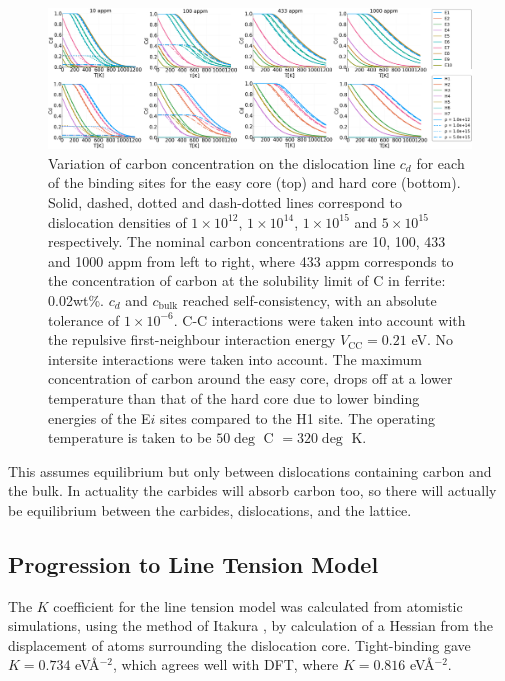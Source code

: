 \documentclass[a4paper,11pt]{article}
\begin{document}
\begin{landscape}
   \begin{figure}	
      \includegraphics[width=1.8\textwidth]{Images/mcclean_isotherm_all.png} 		
   \caption{ Variation of carbon concentration on the dislocation line $c_d$ for each of the binding sites for the easy core (top) and hard core (bottom). Solid, dashed, dotted and dash-dotted lines correspond to dislocation densities of $1\times10^{12}$, $1\times10^{14}$, $1\times10^{15}$ and $5\times10^{15}$ respectively. The nominal carbon concentrations are 10, 100, 433 and 1000 appm from left to right, where 433 appm corresponds to the concentration of carbon at the solubility limit of C in ferrite: 0.02wt\%. $c_d$ and $c_{\text{bulk}}$ reached self-consistency, with an absolute tolerance of $1\times10^{-6}$. C-C interactions were taken into account with the repulsive first-neighbour interaction energy $V_{\text{CC}}=0.21$ eV. No intersite interactions were taken into account. The maximum concentration of carbon around the easy core, drops off at a lower temperature than that of the hard core due to lower binding energies of the E$i$ sites compared to the H1 site. The operating temperature is taken to be $50\deg$ C $= 320 \deg$ K. }
   \label{cdhardeasy}
      \end{figure}
      \end{landscape}

This assumes equilibrium but only between dislocations containing carbon and the
bulk. In actuality the carbides will absorb carbon too, so there will actually be
equilibrium between the carbides, dislocations, and the lattice.






\subsection{Progression to Line Tension Model}
\label{sec:org7dda4c1}


The \(K\) coefficient for the line tension model was calculated from atomistic simulations, using
the method of Itakura \cite{Itakura2012}, by calculation of a Hessian from the displacement of
atoms surrounding the dislocation core. Tight-binding gave \(K = 0.734\) eV\AA{}\(^{-2}\), which agrees well
with DFT, where \(K = 0.816\) eV\AA{}\(^{-2}\).
\end{document}
